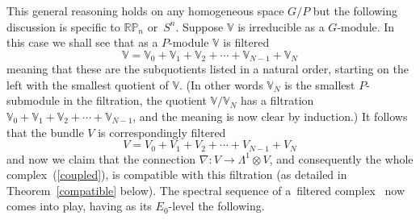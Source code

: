 This general reasoning holds on any homogeneous space $G/P$ but the following
discussion is specif\/ic to ${\mathbb{RP}}_n$ or~$S^n$. Suppose ${\mathbb{V}}$ is
irreducible as a $G$-module. In this case we shall see that as a $P$-module
${\mathbb{V}}$ is f\/iltered
\begin{equation}\label{filtration}
{\mathbb{V}}={\mathbb{V}}_0+{\mathbb{V}}_1+{\mathbb{V}}_2+
\cdots+{\mathbb{V}}_{N-1}+{\mathbb{V}}_N\end{equation} meaning that
these are the subquotients listed in a natural order, starting on the
left with the smallest quotient of $\mathbb{V}$.  (In other words
${\mathbb{V}}_N$ is the smallest $P$-submodule in the f\/iltration, the
quotient ${\mathbb{V}}/{\mathbb{V}}_N$ has a f\/iltration
${\mathbb{V}}_0+{\mathbb{V}}_1+{\mathbb{V}}_2+
\cdots+{\mathbb{V}}_{N-1}$, and the meaning is now clear by induction.)
It follows that the bundle $V$ is correspondingly f\/iltered
\begin{equation}\label{correspondingfiltration}
V=V_0+V_1+V_2+\cdots+V_{N-1}+V_N\end{equation}
and now we claim that the connection $\nabla:V\to\Lambda^1\otimes V$, and
consequently the whole complex~(\ref{coupled}), is compatible with this
f\/iltration (as detailed in Theorem~\ref{compatible} below). The spectral
sequence of a~f\/iltered complex~\cite{c} now comes into play, having as its
$E_0$-level the following.
